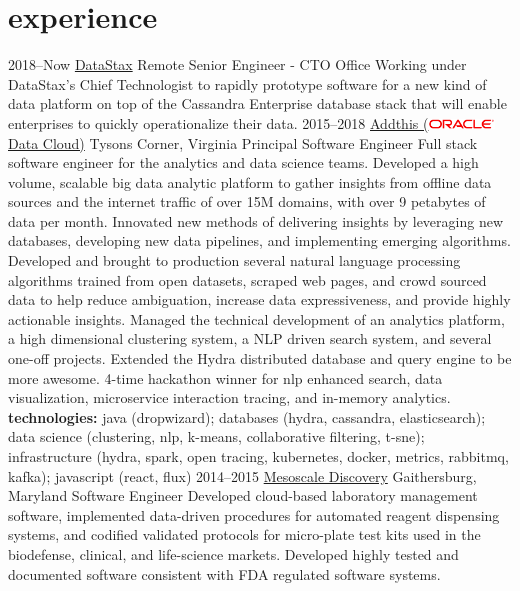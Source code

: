 \documentclass[]{friggeri-cv} %
\begin{document}
\section{experience}
\begin{entrylist}
\entry
{2018--Now}
{\href{https://www.datastax.com/}{DataStax}}
{Remote}
{Senior Engineer - CTO Office}
{
	Working under DataStax's Chief Technologist to rapidly prototype software for a new kind of data platform on top of the Cassandra Enterprise database stack that will enable enterprises to quickly operationalize their data.
}
\entry
{2015--2018}
{\href{https://www.addthis.com/}{Addthis (\includegraphics[width=50pt]{500px-Oracle_logo.svg.png}  Data Cloud)}}
{Tysons Corner, Virginia}
{Principal Software Engineer}
{
	Full stack software engineer for the analytics and data science teams. Developed a high volume, scalable big data analytic platform to gather insights from offline data sources and the internet traffic of over 15M domains, with over 9 petabytes of data per month. Innovated new methods of delivering insights by leveraging new databases, developing new data pipelines, and implementing emerging algorithms. Developed and brought to production several natural language processing algorithms trained from open datasets, scraped web pages, and crowd sourced data to help reduce ambiguation, increase data expressiveness, and provide highly actionable insights. Managed the technical development of an analytics platform, a high dimensional clustering system, a NLP driven search system, and several one-off projects. Extended the Hydra distributed database and query engine to be more awesome. 4-time hackathon winner for nlp enhanced search, data visualization, microservice interaction tracing, and in-memory analytics. \\
	\textbf{technologies:} java (dropwizard); databases (hydra, cassandra, elasticsearch); data science (clustering, nlp, k-means, collaborative filtering, t-sne); infrastructure (hydra, spark, open tracing, kubernetes, docker, metrics, rabbitmq, kafka); javascript (react, flux)
}
\entry
{2014--2015}
{\href{https://www.mesoscale.com/}{Mesoscale Discovery}}
{Gaithersburg, Maryland}
{Software Engineer}
{
	Developed cloud-based laboratory management software, implemented data-driven procedures for automated reagent dispensing systems, and codified validated protocols for micro-plate test kits used in the biodefense, clinical, and life-science markets. Developed highly tested and documented software consistent with FDA regulated software systems.\\
}
\end{entrylist}
\end{document}
